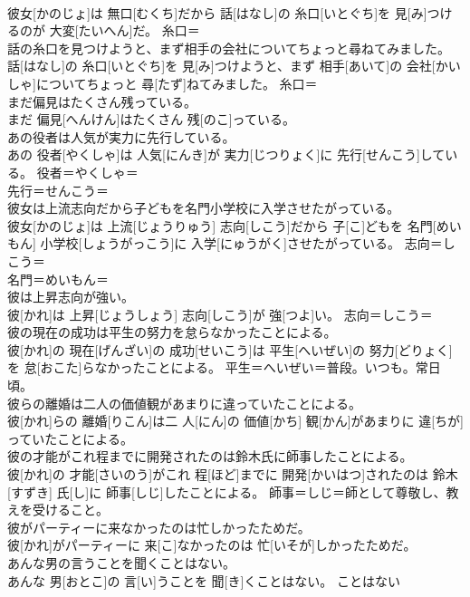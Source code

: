 \documentclass[8pt]{extreport}
\begin{document}
\begin{CJK}{UTF8}{min}
\\	彼女[かのじょ]は 無口[むくち]だから 話[はなし]の 糸口[いとぐち]を 見[み]つけるのが 大変[たいへん]だ。	糸口＝ 
\\	話の糸口を見つけようと、まず相手の会社についてちょっと尋ねてみました。	
\\	話[はなし]の 糸口[いとぐち]を 見[み]つけようと、まず 相手[あいて]の 会社[かいしゃ]についてちょっと 尋[たず]ねてみました。	糸口＝ 
\\	まだ偏見はたくさん残っている。	
\\	まだ 偏見[へんけん]はたくさん 残[のこ]っている。	
\\	あの役者は人気が実力に先行している。	
\\	あの 役者[やくしゃ]は 人気[にんき]が 実力[じつりょく]に 先行[せんこう]している。	役者＝やくしゃ＝ 
\\	先行＝せんこう＝ 
\\	彼女は上流志向だから子どもを名門小学校に入学させたがっている。	
\\	彼女[かのじょ]は 上流[じょうりゅう] 志向[しこう]だから 子[こ]どもを 名門[めいもん] 小学校[しょうがっこう]に 入学[にゅうがく]させたがっている。	志向＝しこう＝ 
\\	名門＝めいもん＝ 
\\	彼は上昇志向が強い。	
\\	彼[かれ]は 上昇[じょうしょう] 志向[しこう]が 強[つよ]い。	志向＝しこう＝ 
\\	彼の現在の成功は平生の努力を怠らなかったことによる。	
\\	彼[かれ]の 現在[げんざい]の 成功[せいこう]は 平生[へいぜい]の 努力[どりょく]を 怠[おこた]らなかったことによる。	平生＝へいぜい＝普段。いつも。常日頃。
\\	彼らの離婚は二人の価値観があまりに違っていたことによる。	
\\	彼[かれ]らの 離婚[りこん]は二 人[にん]の 価値[かち] 観[かん]があまりに 違[ちが]っていたことによる。	
\\	彼の才能がこれ程までに開発されたのは鈴木氏に師事したことによる。	
\\	彼[かれ]の 才能[さいのう]がこれ 程[ほど]までに 開発[かいはつ]されたのは 鈴木[すずき] 氏[し]に 師事[しじ]したことによる。	師事＝しじ＝師として尊敬し、教えを受けること。
\\	彼がパーティーに来なかったのは忙しかったためだ。	
\\	彼[かれ]がパーティーに 来[こ]なかったのは 忙[いそが]しかったためだ。	
\\	あんな男の言うことを聞くことはない。	
\\	あんな 男[おとこ]の 言[い]うことを 聞[き]くことはない。	ことはない 

\end{CJK}
\end{document}
